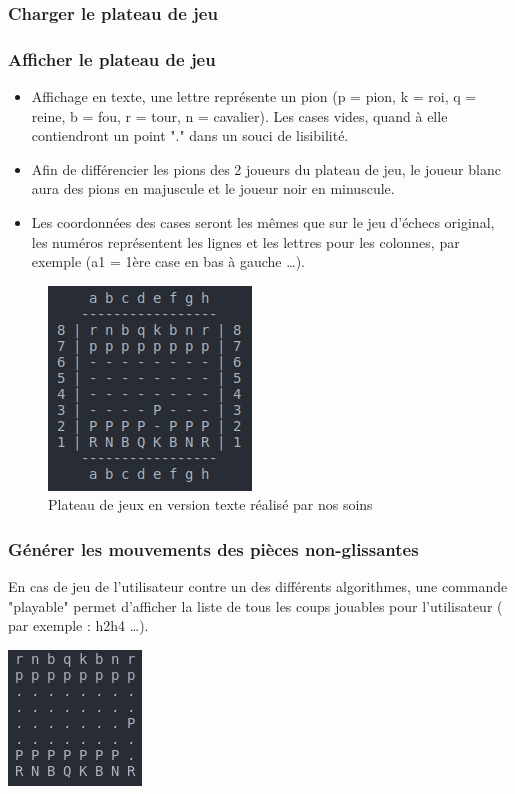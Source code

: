 \huge\documentclass{article}
\begin{document}
    \subsubsection{Charger le plateau de jeu}

    \medskip
    \medskip
    \subsubsection{Afficher le plateau de jeu}
    \medskip
    \begin{itemize}
        \item Affichage en texte, une lettre représente un pion (p = pion, k = roi, q = reine,
        b = fou, r = tour, n = cavalier).
        Les cases vides, quand à elle contiendront un point "." dans un souci de lisibilité.
        \item Afin de différencier les pions des 2 joueurs du plateau de jeu, le joueur blanc aura des pions en majuscule et le joueur noir en minuscule.
        \item Les coordonnées des cases seront les mêmes que sur le jeu d'échecs original, les numéros représentent les lignes et les lettres pour les colonnes, par exemple (a1 = 1ère case en bas à gauche \dots).
    \end{itemize}
    \begin{figure}[h]
        \centering
        \includegraphics[scale = 0.5]{img/pdp_chess_board.png}
        \caption{Plateau de jeux en version texte réalisé par nos soins}
    \end{figure}
    \medskip
    \subsubsection{Générer les mouvements des pièces non-glissantes}
    En cas de jeu de l'utilisateur contre un des différents algorithmes, une commande "playable" permet d'afficher la liste de tous les coups jouables pour l'utilisateur ( par exemple : h2h4 \dots).
    \newline
    \centerline{\includegraphics[scale = 0.5]{img/chess_moveh2h4.png}}
    \medskip
\end{document}

